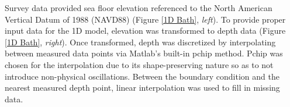 	Survey data provided sea floor elevation referenced to the North American Vertical Datum of 1988 (NAVD88) (Figure \ref{1D Bath}, \textit{left}). To provide proper input data for the 1D model, elevation was transformed to depth data (Figure \ref{1D Bath}, \textit{right}). Once transformed, depth was discretized by interpolating between measured data points via Matlab's built-in pchip method. Pchip was chosen for the interpolation due to its shape-preserving nature so as to not introduce non-physical oscillations. Between the boundary condition and the nearest measured depth point, linear interpolation was used to fill in missing data.
